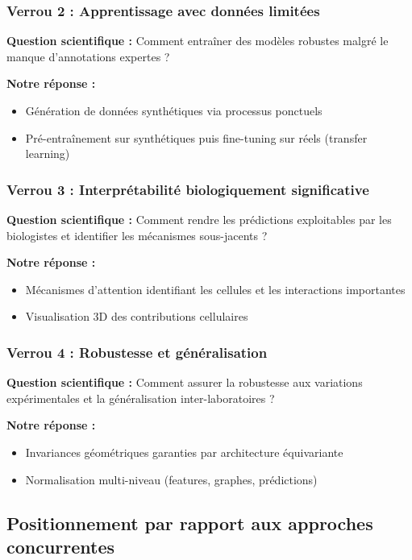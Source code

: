 \subsubsection{Verrou 2 : Apprentissage avec données limitées}

\textbf{Question scientifique :} Comment entraîner des modèles robustes malgré le manque d'annotations expertes ?

\textbf{Notre réponse :}
\begin{itemize}
    \item Génération de données synthétiques via processus ponctuels
    \item Pré-entraînement sur synthétiques puis fine-tuning sur réels (transfer learning)
\end{itemize}

\subsubsection{Verrou 3 : Interprétabilité biologiquement significative}

\textbf{Question scientifique :} Comment rendre les prédictions exploitables par les biologistes et identifier les mécanismes sous-jacents ?

\textbf{Notre réponse :}
\begin{itemize}
    \item Mécanismes d'attention identifiant les cellules et les interactions importantes
    \item Visualisation 3D des contributions cellulaires
\end{itemize}

\subsubsection{Verrou 4 : Robustesse et généralisation}

\textbf{Question scientifique :} Comment assurer la robustesse aux variations expérimentales et la généralisation inter-laboratoires ?

\textbf{Notre réponse :}
\begin{itemize}
    \item Invariances géométriques garanties par architecture équivariante
    \item Normalisation multi-niveau (features, graphes, prédictions)
\end{itemize}

\subsection{Positionnement par rapport aux approches concurrentes}

